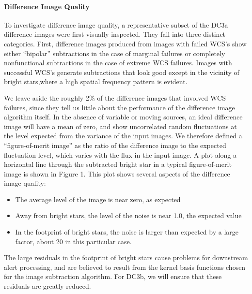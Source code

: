 \paragraph{Difference Image Quality}

To investigate difference image quality, a representative subset of the DC3a difference images
were first visually inspected.  They fall into three distinct
categories. First, difference images produced from images with failed 
WCS's show either ``bipolar'' subtractions in the case of marginal failures or completely nonfunctional subtractions in
the case of extreme WCS failures.  Images with successful WCS's
generate subtractions that look good except in the vicinity of bright
stars,where a high spatial frequency pattern is evident.  

We leave aside the roughly 2\% of
the difference images that involved WCS failures, since they tell us
little about the performance of the difference image algorithm itself.
In the absence of variable or moving sources, an ideal difference
image will have a mean of zero, and show uncorrelated random
fluctuations at the level expected from the variance of the input
images.  We therefore defined a ``figure-of-merit image'' as the ratio
of the difference image to the expected fluctuation level, which
varies with the flux in the input image.
A plot along a horizontal line through
the subtracted bright star in a typical figure-of-merit image is shown in
Figure 1.  This plot shows several aspects of the difference
image quality:

\begin{itemize}
\item The average level of the image is near zero, as expected
\item Away from bright stars, the level of the noise is near 1.0, the
  expected value
\item In the footprint of bright stars, the noise is larger than
  expected by a large factor, about 20 in this particular case.
\end{itemize}  

The large residuals in the footprint of bright stars cause problems
for downstream alert processing, and are believed to result from the
kernel basis functions chosen for the image subtraction algorithm.
For DC3b, we will ensure that these residuals are greatly reduced.

